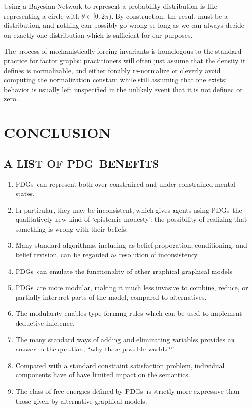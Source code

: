 \documentclass{article}
\newcommand{\MN}{PDG}
\newcommand{\MNs}{\MN s}
\numberwithin{equation}{section}
\begin{document}
\begin{vfull}
		Using a Bayesian Network to represent a probability distribution is like representing a circle with $\theta \in [0, 2\pi)$.
		By construction, the result must be a distribution, and nothing can possibly go wrong so long as we can always decide on exactly one distribution which is sufficient for our purposes.
		
		
		The process of mechanistically forcing invariants is homologous to the standard practice for factor graphs: practitioners will often just assume that the density it defines is normalizable, and either forcibly re-normalize or cleverly avoid computing the normalization constant while still assuming that one exists; behavior is usually left unspecified in the unlikely event that it is not defined or zero.
	\end{vfull}
	
	\section{CONCLUSION}
	\subsection{A LIST OF \MN\ BENEFITS}\label{sec:list-of-benefits}
	\begin{enumerate}[nosep]
		\item \MNs\ can represent both over-constrained and under-constrained mental states. 
		\item In particular, they may be inconsistent, which gives agents using \MNs\ the qualitatively new kind of `epistemic modesty': the possibility of realizing that something is wrong with their beliefs.
		\item Many standard algorithms, including as belief propogation, conditioning, and belief revision, can be regarded as resolution of inconsistency.
		\item \MNs\ can emulate the functionality of other graphical graphical models.
		\item \MNs\ are more modular, making it much less invasive to combine, reduce, or partially interpret parts of the model, compared to alternatives.
		\item The modularity enables type-forming rules which can be used to implement deductive inference.
		\item The many standard ways of adding and eliminating variables provides an answer to the question, ``why these possible worlds?''
		\item Compared with a standard constraint satisfaction problem, individual components have of have limited impact on the semantics.
		\item The class of free energies defined by \MNs\ is strictly more expressive than those given by alternative graphical models.
	\end{enumerate} %
	
\end{document}
